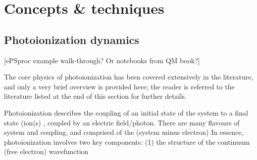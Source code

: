 \section{Concepts \& techniques}

\subsection{Photoionization dynamics} 
[ePSproc example walk-through? Or notebooks from QM book?]

The core physics of photoionization has been covered extensively in the literature, and only a very brief overview is provided here; the reader is referred to the literature listed at the end of this section for further details.

Photoionization describes the coupling of an initial state of the system to a final state (ion(s) , coupled by an electric field/photon. There are many flavours of system and coupling, and 
comprised of the (system minus electron)  In essence, photoionization involves two key components: (1) the structure of the continuum (free electron) wavefunction 